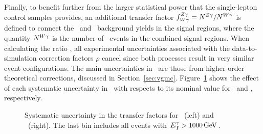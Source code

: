 Finally, to benefit further from the larger statistical power that the single-lepton control samples provides, an additional transfer factor $f^{{Z}\gamma}_{{W}\gamma} = N^{{Z}\gamma}_{} / N^{{W}\gamma}_{}$ is defined to connect the \zinvg\ and \wlng\ background yields in the signal regions, where the quantity $N^{{W}\gamma}_{}$ is the number of \wlng\ events in the combined signal regions. 
When calculating the ratio \fZW, all experimental uncertainties associated with the data-to-simulation correction factors $\rho$ cancel since both processes result in very similar event configurations. 
The main uncertainties in \fZW\ are those from higher-order theoretical corrections, discussed in Section~\ref{sec:vgmc}.
Figure~\ref{fig:tf_syst} shows the effect of each systematic uncertainty in \fZW\ with respects to its nominal value for \zinvg\ and \wlng, respectively.

\begin{figure}[htbp]
  \centering
  \caption{
    Systematic uncertainty in the transfer factors for \zinvg\ (left) and \wlng\ (right). The last bin includes all events with $E_{\mathrm{T}}^{\gamma} > 1000\,\text{Ge\hspace{-.08em}V}$.
  }
  \label{fig:tf_syst}
\end{figure}

